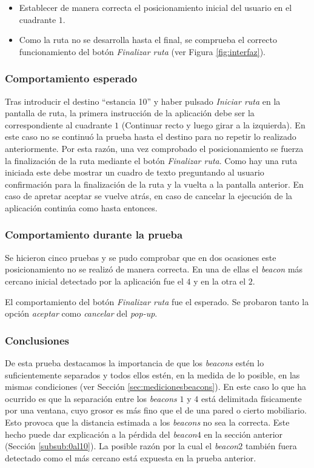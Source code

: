 \begin{itemize}
	\item Establecer de manera correcta el posicionamiento inicial del usuario en el cuadrante $1$.
	
	\item Como la ruta no se desarrolla hasta el final, se comprueba el correcto funcionamiento del botón \textit{Finalizar ruta} (ver Figura \ref{fig:interfaz}).
\end{itemize}

\subsubsection*{Comportamiento esperado}

Tras introducir el destino ``estancia 10'' y haber pulsado \textit{Iniciar ruta} en la pantalla de ruta, la primera instrucción de la aplicación debe ser la correspondiente al cuadrante $1$ (Continuar recto y luego girar a la izquierda). En este caso no se continuó la prueba hasta el destino para no repetir lo realizado anteriormente. Por esta razón, una vez comprobado el posicionamiento se fuerza la finalización de la ruta mediante el botón \textit{Finalizar ruta}. Como hay una ruta iniciada este debe mostrar un cuadro de texto preguntando al usuario confirmación para la finalización de la ruta y la vuelta a la pantalla anterior. En caso de apretar aceptar se vuelve atrás, en caso de cancelar la ejecución de la aplicación continúa como hasta entonces.


\subsubsection*{Comportamiento durante la prueba}

Se hicieron cinco pruebas y se pudo comprobar que en dos ocasiones este posicionamiento no se realizó de manera correcta. En una de ellas el \textit{beacon} más cercano inicial detectado por la aplicación fue el $4$ y en la otra el $2$.

El comportamiento del botón \textit{Finalizar ruta} fue el esperado. Se probaron tanto la opción \textit{aceptar} como \textit{cancelar} del \textit{pop-up}.


\subsubsection*{Conclusiones}

De esta prueba destacamos la importancia de que los \textit{beacons} estén lo suficientemente separados y todos ellos estén, en la medida de lo posible, en las mismas condiciones (ver Sección \ref{sec:medicionesbeacons}). En este caso lo que ha ocurrido es que la separación entre los \textit{beacons} $1$ y $4$ está delimitada físicamente por una ventana, cuyo grosor es más fino que el de una pared o cierto mobiliario. Esto provoca que la distancia estimada a los \textit{beacons} no sea la correcta. Este hecho puede dar explicación a la pérdida del \textit{beacon$4$} en la sección anterior (Sección \ref{subsub:0al10}). La posible razón por la cual el \textit{beacon$2$} también fuera detectado como el más cercano está expuesta en la prueba anterior.


